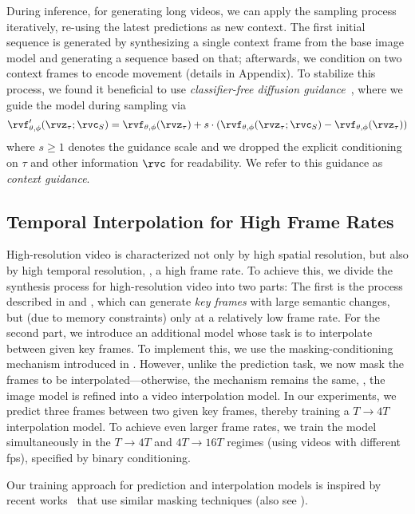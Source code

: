 During inference, for generating long videos, we can apply the sampling process iteratively, re-using the latest predictions as new context. The first initial sequence is generated by synthesizing a single context frame from the base image model and generating a sequence based on that; afterwards, we condition on two context frames to encode movement (details in Appendix). 
To stabilize this process, we found it beneficial to use \emph{classifier-free diffusion guidance}~\cite{ho2021classifierfree}, where we guide the model during sampling via
{\small\begin{equation}
\rvf_{\theta, \phi}'(\rvz_\tau; \rvc_S) = \rvf_{\theta, \phi}(\rvz_\tau) + s \cdot \left(\rvf_{\theta, \phi}(\rvz_\tau; \rvc_S) - \rvf_{\theta, \phi}(\rvz_\tau) \right)
\end{equation}}
where $s{\geq}1$ denotes the guidance scale and we dropped the explicit conditioning on $\tau$ and other information $\rvc$ for readability. 
We refer to this guidance as \emph{context guidance}.

\subsection{Temporal Interpolation for High Frame Rates}
High-resolution video is characterized not only by high spatial resolution, but also by high temporal resolution, \ie, a high frame rate. 
To achieve this, we divide the synthesis process for high-resolution video into two parts: The first is the process described in  and , which can generate \emph{key frames} with large semantic changes, but (due to memory constraints) only at a relatively low frame rate. 
For the second part, we introduce an additional model whose task is to interpolate between given key frames. 
To implement this, we use the masking-conditioning mechanism introduced in . However, unlike the prediction task, we now mask the frames to be interpolated---otherwise, the mechanism remains the same, \ie, the image model is refined into a video interpolation model. In our experiments, we predict three frames between two given key frames, thereby training a $T \rightarrow 4T$ interpolation model. To achieve even larger frame rates, we train the model simultaneously in the $T \rightarrow 4T$ and $4T \rightarrow 16T$ regimes (using videos with different fps), specified by binary conditioning. 

Our training approach for prediction and interpolation models is inspired by recent works~\cite{voleti2022mcvd,harvey2022flexible,hoeppe2022diffusion} that use similar masking techniques (also see ).

